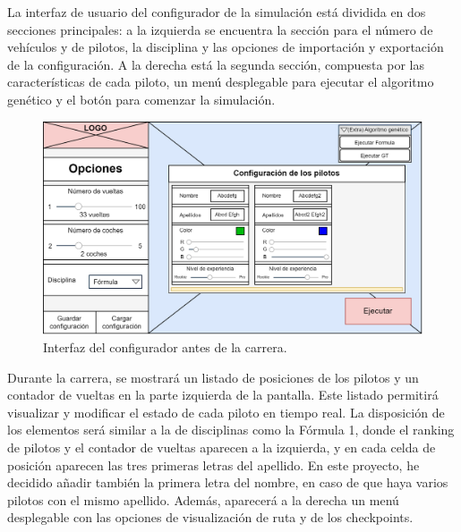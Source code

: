 \bigskip

La interfaz de usuario del configurador de la simulación
está dividida en dos secciones principales: a la izquierda se encuentra la sección para el número de vehículos y de pilotos, la disciplina y las opciones de importación y exportación de la configuración. A la derecha está la segunda sección, compuesta por las características de cada piloto, un menú desplegable para ejecutar el algoritmo genético y el botón para comenzar la simulación.

\begin{figure}[H]
    \centering
    \includegraphics[width=\textwidth]{imagenes/pag1.png}
    \caption{Interfaz del configurador antes de la carrera.}
\end{figure}

Durante la carrera, se mostrará un listado de posiciones de los pilotos y un contador de vueltas 
en la parte izquierda de la pantalla. Este listado permitirá visualizar y modificar el estado de cada piloto en tiempo real. La disposición de los elementos será similar a la de disciplinas como la Fórmula 1, donde el ranking de pilotos y el contador de vueltas aparecen a la izquierda, y en cada celda de posición aparecen las tres primeras letras del apellido. En este proyecto, he decidido añadir también la primera letra del nombre, en caso de que haya varios pilotos con el mismo apellido. Además, aparecerá a la derecha un menú desplegable con las opciones de visualización de ruta y de los checkpoints.


